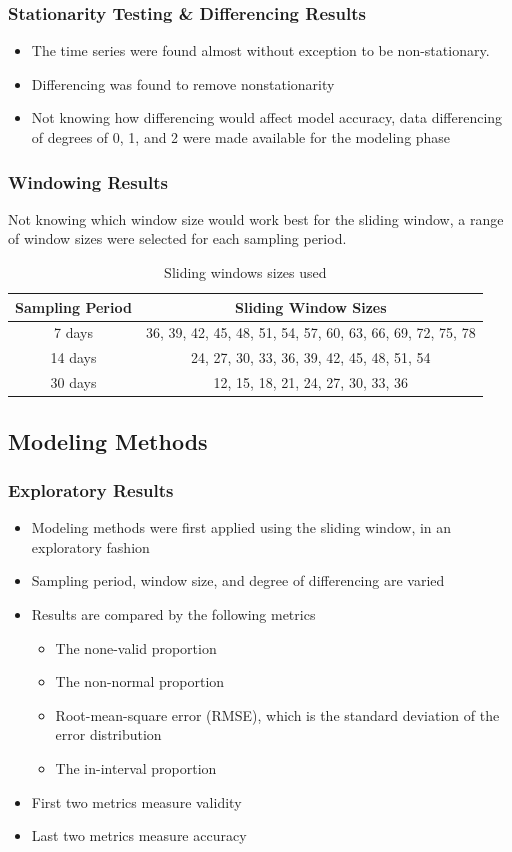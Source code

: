 \documentclass[presentation]{beamer}
\begin{document}
\begin{frame}[t]
\frametitle{Stationarity Testing \& Differencing Results}
\begin{itemize}
\item
The time series were found almost without exception to be non-stationary.
\item
Differencing was found to remove nonstationarity
\item
Not knowing how differencing would affect model accuracy, data differencing of degrees of 0, 1, and 2 were made available for the modeling phase
\end{itemize}

\end{frame}

\begin{frame}[t]
\frametitle{Windowing Results}
Not knowing which window size would work best for the sliding window, a range
of window sizes were selected for each sampling period.

\begin{table}
\centering
\scriptsize  
\caption{Sliding windows sizes used}
\begin{tabular}{c | c}
Sampling Period & Sliding Window Sizes \\

\hline
7 days & 36, 39, 42, 45, 48, 51, 54, 57, 60, 63, 66, 69, 72, 75, 78 \\
14 days & 24, 27, 30, 33, 36, 39, 42, 45, 48, 51, 54 \\
30 days & 12, 15, 18, 21, 24, 27, 30, 33, 36 \\
\hline
\end{tabular}
\end{table}

\end{frame}

\subsection{Modeling Methods}

\begin{frame}[t]
\frametitle{Exploratory Results}
\begin{itemize}
\item{Modeling methods were first applied using the sliding window, in an exploratory fashion}
\item{Sampling period, window size, and degree of differencing are varied}
\item{Results are compared by the following metrics
\begin{itemize}
\item{The none-valid proportion}
\item{The non-normal proportion}
\item{Root-mean-square error (RMSE), which is the standard deviation of the error distribution}
\item{The in-interval proportion}
\end{itemize}
}
\item{First two metrics measure validity}
\item{Last two metrics measure accuracy}
\end{itemize}
\end{frame}
\end{document}
